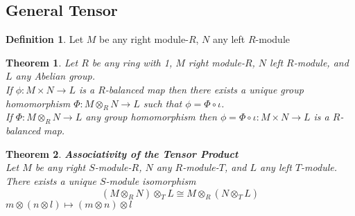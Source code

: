 \documentclass{article}
\theoremstyle{plain}
\newtheorem{thm}{Theorem}[section]
\theoremstyle{definition}
\newtheorem{defn}{Definition}[section]
\theoremstyle{remark}
\begin{document}
  \subsection{General Tensor}
  \begin{defn}
    Let $M$ be any right module-$R$, $N$ any left $R$-module
  \end{defn}
  \begin{thm}
    Let $R$ be any ring with 1, $M$ right module-$R$, $N$ left
    $R$-module, and $L$ any Abelian group. \\[1em]
    If $\phi:M\times N\to L$ is a $R$-balanced map then there exists a 
    unique group homomorphism $\Phi:M\otimes_RN\to L$ such that $\phi=\Phi\circ\iota$.\\[1em]
    If $\Phi:M\otimes_RN\to L$ any group homomorphism then 
    $\phi=\Phi\circ\iota:M\times N\to L$ is a $R$-balanced map.
  \end{thm}
  \begin{thm}\textbf{Associativity of the Tensor Product}\\
    Let $M$ be any right $S$-module-$R$, $N$ any $R$-module-$T$, and $L$
    any left $T$-module.
    \\[1em]
    There exists a unique $S$-module isomorphism
   \[ (M\otimes_RN)\otimes_TL\cong M\otimes_R(N\otimes_T L) \]
   $m\otimes(n\otimes l)\mapsto (m\otimes n)\otimes l$
  \end{thm}
\end{document}
